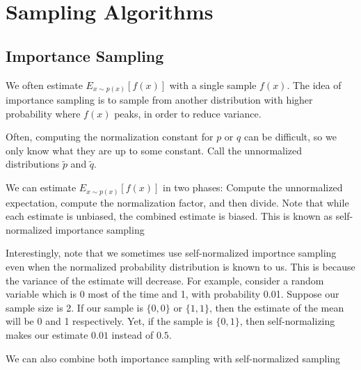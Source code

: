 \documentclass[12pt]{article}
\begin{document}
\section{Sampling Algorithms}

\subsection{Importance Sampling}

We often estimate $E_{x \sim p(x)}[f(x)]$
with a single sample $f(x)$. The idea of importance sampling is to sample from another distribution with higher probability where $f(x)$ peaks, in order to reduce variance.


Often, computing the normalization constant for $p$ or $q$ can be difficult, so we only know what they are up to some constant. Call the unnormalized distributions $\tilde p$ and $\tilde q$. 

We can estimate $E_{x \sim p(x)}[f(x)]$ in two phases: Compute the unnormalized expectation, compute the normalization factor, and then divide. Note that while each estimate is unbiased, the combined estimate is biased. This is known as self-normalized importance sampling


Interestingly, note that we sometimes use self-normalized importnce sampling even when the normalized probability distribution is known to us. This is because the variance of the estimate will decrease. For example, consider a random variable which is 0 most of the time and 1, with probability 0.01. Suppose our sample size is 2. If our sample is $\{0,0\}$ or $\{1,1\}$, then the estimate of the mean will be 0 and 1 respectively. Yet, if the sample is $\{0,1\}$, then self-normalizing makes our estimate $0.01$ instead of $0.5$.

We can also combine both importance sampling with self-normalized sampling

\iffalse
{}

\end{document}
